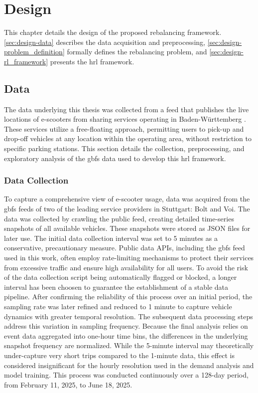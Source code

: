 \chapter{Design}\label{sec:design} %
This chapter details the design of the proposed rebalancing framework.
\autoref{sec:design-data} describes the data acquisition and preprocessing, \autoref{sec:design-problem_definition} formally defines the rebalancing problem, and \autoref{sec:design-rl_framework} presents the \gls{hrl} framework.

\section{Data}\label{sec:design-data}
The data underlying this thesis was collected from a  \cite{mobilitydata_specification_2024} feed that publishes the live locations of e-scooters from sharing services operating in Baden-Württemberg \cite{mobidata_bw_gebundelte_2022}.
These services utilize a free-floating approach, permitting users to pick-up and drop-off vehicles at any location within the operating area, without restriction to specific parking stations.
This section details the collection, preprocessing, and exploratory analysis of the \gls{gbfs} data used to develop this \gls{hrl} framework. 


\subsection{Data Collection}
To capture a comprehensive view of e-scooter usage, data was acquired from the \gls{gbfs} feeds of two of the leading service providers in Stuttgart: Bolt and Voi.
The data was collected by crawling the public feed, creating detailed time-series snapshots of all available vehicles.
These snapshots were stored as JSON files for later use.
The initial data collection interval was set to 5 minutes as a conservative, precautionary measure.
Public data APIs, including the \gls{gbfs} feed used in this work, often employ rate-limiting mechanisms to protect their services from excessive traffic and ensure high availability for all users.
To avoid the risk of the data collection script being automatically flagged or blocked, a longer interval has been choosen to guarantee the establishment of a stable data pipeline.
After confirming the reliability of this process over an initial period, the sampling rate was later refined and reduced to 1 minute to capture vehicle dynamics with greater temporal resolution.
The subsequent data processing steps address this variation in sampling frequency.
Because the final analysis relies on event data aggregated into one-hour time bins, the differences in the underlying snapshot frequency are normalized.
While the 5-minute interval may theoretically under-capture very short trips compared to the 1-minute data, this effect is considered insignificant for the hourly resolution used in the demand analysis and model training.
This process was conducted continuously over a 128-day period, from February 11, 2025, to June 18, 2025.

